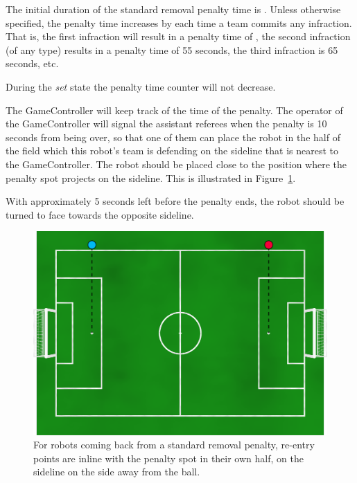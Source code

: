 The initial duration of the standard removal penalty time is \StandardPenaltyTime.
Unless otherwise specified, the penalty time increases by \StandardPenaltyIncrease each time a team commits any infraction.
That is, the first infraction will result in a penalty time of \StandardPenaltyTime, the second infraction (of any type) results in a penalty time of 55 seconds, the third infraction is 65 seconds, etc.

During the \emph{set} state the penalty time counter will not decrease.

The GameController will keep track of the time of the penalty. The operator of the GameController will signal the assistant referees when the penalty is 10 seconds from being over, so that one of them can place the robot in the half of the field which this robot's team is defending on the sideline that is nearest to the GameController. The robot should be placed close to the position where the penalty spot projects on the sideline. This is illustrated in Figure~\ref{fig:penalty_re-entry_points}.

With approximately 5 seconds left before the penalty ends, the robot should be turned to face towards the opposite sideline.

\begin{figure}[t]
	\centerline{\includegraphics[width=\columnwidth]{figs/penalty_re-entry_points_2020.png}}
	\caption{For robots coming back from a standard removal penalty, re-entry points  are inline with the penalty spot in their own half, on the sideline on the side away from the ball.}
	\label{fig:penalty_re-entry_points}
\end{figure}

